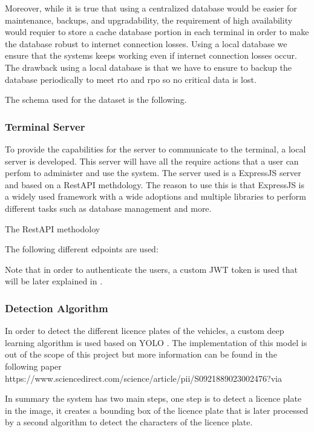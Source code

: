 Moreover, while it is true that using a centralized database would be easier for maintenance, backups, and upgradability, the requirement of high availability would requier to store a cache database portion in each terminal in order to make the database robust to internet connection losses. Using a local database we ensure that the systems keeps working even if internet connection losses occur. The drawback using a local database is that we have to ensure to backup the database periodically to meet \gls{rto} and \gls{rpo} so no critical data is lost.

The schema used for the dataset is the following.


\subsubsection{Terminal Server}

To provide the capabilities for the server to communicate to the terminal, a local server is developed. This server will have all the require actions that a user can perfom to administer and use the system. The server used is a ExpressJS  server and based on a RestAPI methdology. The reason to use this is that ExpressJS is a widely used framework with a wide adoptions and multiple libraries to perform different tasks such as database management and more.

The RestAPI methodoloy 

The following different edpoints are used:

Note that in order to authenticate the users, a custom JWT token is used that will be later explained in .

\subsubsection{Detection Algorithm}

In order to detect the different licence plates of the vehicles, a custom deep learning algorithm is used based on YOLO . The implementation of this model is out of the scope of this project but more information can be found in the following paper https://www.sciencedirect.com/science/article/pii/S0921889023002476?via%

In summary the system has two main steps, one step is to detect a licence plate in the image, it creates a bounding box of the licence plate that is later processed by a second algorithm to detect the characters of the licence plate.

